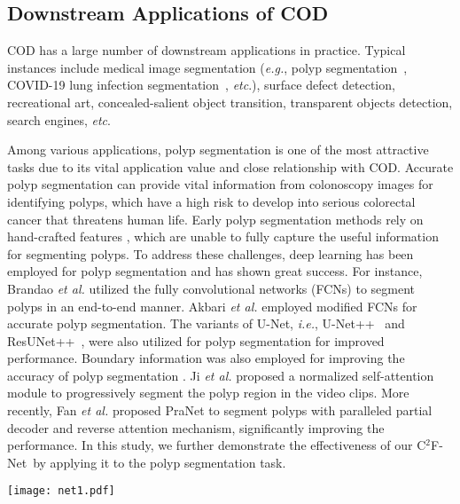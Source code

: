 \documentclass[lettersize,journal]{IEEEtran}
\newcommand{\our}{{C$^2$F-Net}}
\newcommand{\ourM}{{C$^2$F-Net}}
\def\ie{\emph{i.e.}}
\def\eg{\emph{e.g.}}
\def\etc{\emph{etc}}
\def\etal{{\em et al.}}
\def\etal{{\em et al.}}
\begin{document}
\subsection{Downstream Applications of COD}\label{applications}

COD has a large number of downstream applications in practice. Typical instances include medical image segmentation (\eg, polyp segmentation~\cite{ji2022vps,ji2021pnsnet}, COVID-19 lung infection segmentation~\cite{fan2020infnet}, \etc.), surface defect detection, recreational art, concealed-salient object transition, transparent objects detection, search engines, \etc \cite{fan2021concealed}.

Among various applications, polyp segmentation is one of the most attractive tasks due to its vital application value and close relationship with COD.
Accurate polyp segmentation can provide vital information from colonoscopy images for identifying polyps, which have a high risk to develop into serious colorectal cancer that threatens human life.
Early polyp segmentation methods rely on hand-crafted features \cite{mamonov2014automated}, which are unable to fully capture the useful information for segmenting polyps.
To address these challenges, deep learning has been employed for polyp segmentation and has shown great success.
For instance, Brandao \etal \cite{brandao2017fully} utilized the fully convolutional networks (FCNs) to segment polyps in an end-to-end manner.
Akbari \etal \cite{akbari2018polyp} employed modified FCNs for accurate polyp segmentation.
The variants of U-Net, \ie, U-Net++~\cite{unetplus} and ResUNet++~\cite{jha2019resunetplus}, were also utilized for polyp segmentation for improved performance.
Boundary information was also employed for improving the accuracy of polyp segmentation \cite{murugesan2019psi,fang2019selective}.
Ji \etal \cite{ji2021pnsnet} proposed a normalized self-attention module to progressively segment the polyp region in the video clips. 
More recently, Fan \etal \cite{pranet} proposed PraNet to segment polyps with paralleled partial decoder and reverse attention mechanism, significantly improving the performance.
In this study, we further demonstrate the effectiveness of our \ourM~by applying it to the polyp segmentation task.



\begin{figure*}[ht]
	\centering{
	}
	\texttt{[image: net1.pdf]}
	\caption{The overall framework of our \our, including three main components, \ie, attention-induced cross-level fusion module (ACFM), dual-branch global context module (DGCM), and~camouflage inference module (CIM). Note that MRB and MSCA are short names for multi-scale residual block and multi-scale channel attention, respectively.
	See Sec.~\ref{Methods} for details.
	}
	\label{fig:net1}
\end{figure*}
\end{document}
